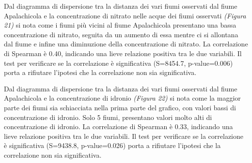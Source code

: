 \documentclass{article} %
\begin{document}
Dal diagramma di dispersione tra la distanza dei vari fiumi osservati dal fiume Apalachicola e la concentrazione di nitrato nelle acque dei fiumi osservati \textit{(Figura 21)} si nota come i fiumi più vicini al fiume Apalachicola presentano una bassa concentrazione di nitrato, seguita da un aumento di essa mentre ci si allontana dal fiume e infine una diminuzione della concentrazione di nitrato.
La correlazione di Spearman è 0.40, indicando una lieve relazione positiva tra le due variabili. 
Il test per verificare se la correlazione è significativa (S=8454.7, p-value=0.006) porta a rifiutare l'ipotesi che la correlazione non sia significativa.

Dal diagramma di dispersione tra la distanza dei vari fiumi osservati dal fiume Apalachicola e la concentrazione di idronio \textit{(Figura 22)} si nota come la maggior parte dei fiumi sia schiacciata nella prima parte del grafico, con valori bassi di concentrazione di idronio. Solo 5 fiumi, presentano valori molto alti di concentrazione di idronio.
La correlazione di Spearman è 0.33, indicando una lieve relazione positiva tra le due variabili. 
Il test per verificare se la correlazione è significativa (S=9438.8, p-value=0.026) porta a rifiutare l'ipotesi che la correlazione non sia significativa.
\end{document}
